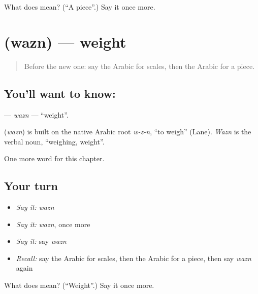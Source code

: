 \begin{tcolorbox}[breakable,colback=teal!4,colframe=teal!35!black,title={Before you move on}]
What does  mean? (\textquotedblleft{}A piece\textquotedblright{}.) Say it once more.
\end{tcolorbox}
\section[\texorpdfstring{\ar{وزن} (wazn)}{وزن (wazn)}]{ (wazn) — weight}

\label{lesson:AR-C218-wazn}



\begin{quote}
Before the new one: say the Arabic for scales, then the Arabic for a piece.
\end{quote}

\subsection*{You'll want to know: }
\textbf{} — \emph{wazn} — \textquotedblleft{}weight\textquotedblright{}.

\begin{cousinweb}
\textbf{} (\emph{wazn}) is built on the native Arabic root \emph{w-z-n}, \textquotedblleft{}to weigh\textquotedblright{} (Lane). \emph{Wazn} is the verbal noun, \textquotedblleft{}weighing, weight\textquotedblright{}.
\end{cousinweb}

\begin{grammarlens}[title={What you've built}]
One more word for this chapter.
\end{grammarlens}

\subsection*{Your turn}
\begin{itemize}
\raggedright
  \item \emph{Say it:} \emph{wazn}
  \item \emph{Say it:} \emph{wazn}, once more
  \item \emph{Say it:} say \emph{wazn}
  \item \emph{Recall:} say the Arabic for scales, then the Arabic for a piece, then say \emph{wazn} again
\end{itemize}

\begin{tcolorbox}[breakable,colback=teal!4,colframe=teal!35!black,title={Before you move on}]
What does  mean? (\textquotedblleft{}Weight\textquotedblright{}.) Say it once more.
\end{tcolorbox}
